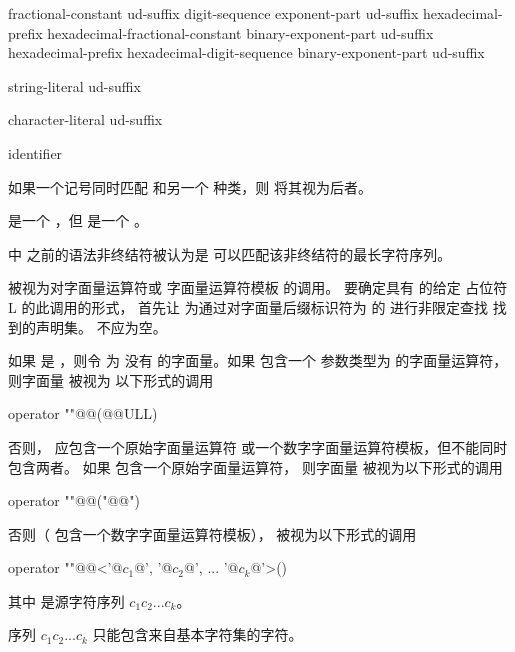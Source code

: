 \begin{bnf}
\br
    fractional-constant  ud-suffix\br
    digit-sequence exponent-part ud-suffix\br
    hexadecimal-prefix hexadecimal-fractional-constant binary-exponent-part ud-suffix\br
    hexadecimal-prefix hexadecimal-digit-sequence binary-exponent-part ud-suffix
\end{bnf}

\begin{bnf}
\br
    string-literal ud-suffix
\end{bnf}

\begin{bnf}
\br
    character-literal ud-suffix
\end{bnf}

\begin{bnf}
\br
    identifier
\end{bnf}

\pnum
如果一个记号同时匹配  和另一个  种类，则
将其视为后者。
\begin{example}
是一个 ，但  是一个
。
\end{example}
 中  之前的语法非终结符被认为是
可以匹配该非终结符的最长字符序列。

\pnum
{} 被视为对字面量运算符或
字面量运算符模板 的调用。
要确定具有   的给定  占位符 {L} 的此调用的形式，
首先让  为通过对字面量后缀标识符为  的 
进行非限定查找 找到的声明集。
 不应为空。

\pnum
如果  是 ，则令  为
没有  的字面量。如果  包含一个
参数类型为  的字面量运算符，则字面量  被视为
以下形式的调用
\begin{codeblock}
operator ""@@(@@ULL)
\end{codeblock}
否则， 应包含一个原始字面量运算符
或一个数字字面量运算符模板，但不能同时包含两者。
如果  包含一个原始字面量运算符，
则字面量  被视为以下形式的调用
\begin{codeblock}
operator ""@@("@@")
\end{codeblock}
否则（ 包含一个数字字面量运算符模板），
 被视为以下形式的调用
\begin{codeblock}
operator ""@@<'@$c_1$@', '@$c_2$@', ... '@$c_k$@'>()
\end{codeblock}
其中  是源字符序列 $c_1c_2...c_k$。
\begin{note}
序列
$c_1c_2...c_k$ 只能包含来自基本字符集的字符。
\end{note}

